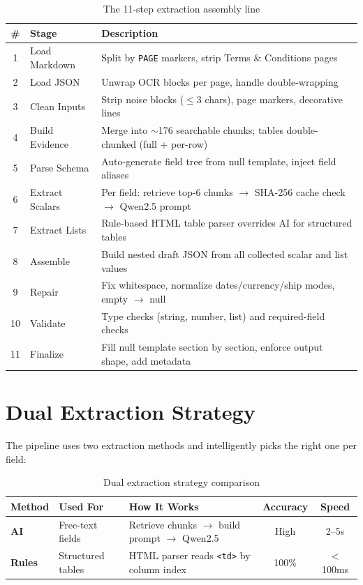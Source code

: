 \documentclass[12pt,a4paper]{report}
\begin{document}
\begin{table}[H]
\centering\small\sffamily
\begin{tabularx}{\textwidth}{c l X}
\toprule
\textbf{\#} & \textbf{Stage} & \textbf{Description} \\
\midrule
1 & Load Markdown & Split by \texttt{PAGE} markers, strip Terms \& Conditions pages \\
2 & Load JSON & Unwrap OCR blocks per page, handle double-wrapping \\
3 & Clean Inputs & Strip noise blocks ($\leq$3 chars), page markers, decorative lines \\
4 & Build Evidence & Merge into $\sim$176 searchable chunks; tables double-chunked (full + per-row) \\
5 & Parse Schema & Auto-generate field tree from null template, inject field aliases \\
6 & Extract Scalars & Per field: retrieve top-6 chunks $\rightarrow$ SHA-256 cache check $\rightarrow$ Qwen2.5 prompt \\
7 & Extract Lists & Rule-based HTML table parser overrides AI for structured tables \\
8 & Assemble & Build nested draft JSON from all collected scalar and list values \\
9 & Repair & Fix whitespace, normalize dates/currency/ship modes, empty $\rightarrow$ null \\
10 & Validate & Type checks (string, number, list) and required-field checks \\
11 & Finalize & Fill null template section by section, enforce output shape, add metadata \\
\bottomrule
\end{tabularx}
\caption{The 11-step extraction assembly line}
\end{table}

\section{Dual Extraction Strategy}

The pipeline uses two extraction methods and intelligently picks the right one per field:

\begin{table}[H]
\centering\small\sffamily
\begin{tabularx}{\textwidth}{l l X c c}
\toprule
\textbf{Method} & \textbf{Used For} & \textbf{How It Works} & \textbf{Accuracy} & \textbf{Speed} \\
\midrule
\textbf{AI} & Free-text fields & Retrieve chunks $\rightarrow$ build prompt $\rightarrow$ Qwen2.5 & High & 2--5s \\
\textbf{Rules} & Structured tables & HTML parser reads \texttt{<td>} by column index & 100\% & $<$100ms \\
\bottomrule
\end{tabularx}
\caption{Dual extraction strategy comparison}
\end{table}
\end{document}
